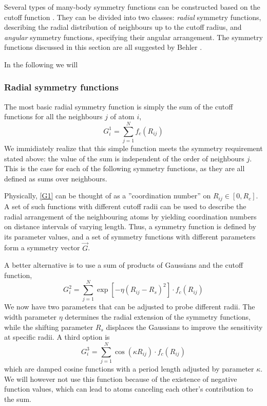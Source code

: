 \documentclass[twoside,english]{uiofysmaster}
\begin{document}
Several types of many-body symmetry functions can be
constructed based on the cutoff function \cite{cutoffFunction}. 
They can be divided into two classes: \textit{radial} symmetry functions, describing 
the radial distribution of neighbours up to the cutoff radius, and \textit{angular} symmetry functions, specifying their
angular arrangement. The symmetry functions discussed in this section are all suggested by Behler \cite{Behler11symmetry}. 

In the following we will 

\subsubsection{Radial symmetry functions}
The most basic radial symmetry function is simply the sum of the cutoff functions for all the neighbours $j$ of 
atom $i$,
\begin{equation}
 G_i^1 = \sum_{j=1}^N f_c(R_{ij})
 \label{G1}
\end{equation}
We immidiately realize that this simple function meets the symmetry requirement stated above: the value 
of the sum is independent of the order of neighbours $j$. This is the case for each of the following symmetry functions, as they 
are all defined as sums over neighbours. 

Physically, \eqref{G1} can be thought of as a ''coordination number'' on $R_{ij} \in [0,R_c]$.
A set of such functions with different cutoff radii can be used to describe the radial arrangement of the neighbouring atoms by
yielding coordination numbers on distance intervals of varying length. Thus, a symmetry function is defined by 
its parameter values, 
and a set of symmetry functions with different parameters form a symmetry vector $\vec{G}$. 

A better alternative is to use a sum of products of Gaussians and the cutoff function, 
\begin{equation}
 G_i^2 = \sum_{j=1}^N \exp[-\eta(R_{ij}-R_s)^2] \cdot f_c(R_{ij})
 \label{G2}
\end{equation}
We now have two parameters that can be adjusted to probe different radii. The width parameter $\eta$ determines the 
radial extension of the symmetry functions, while the shifting parameter $R_s$ displaces the Gaussians to improve
the sensitivity at specific radii. A third option is 
\begin{equation}
 G_i^3 = \sum_{j=1}^N \cos(\kappa R_{ij}) \cdot f_c(R_{ij})
 \label{G3}
\end{equation}
which are damped cosine functions with a period length adjusted by parameter $\kappa$. We will however not use 
this function because of the existence of negative function values, which can lead to atoms canceling each other's
contribution to the sum. 
\end{document}
